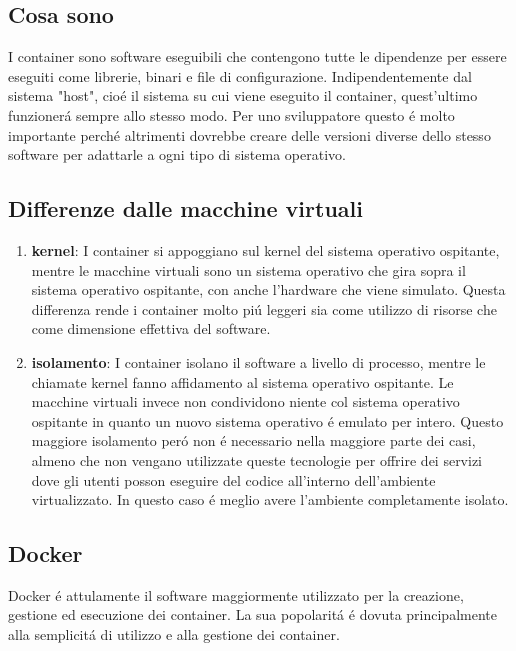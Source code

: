 \subsection{Cosa sono}
\cite{container}I container sono software eseguibili che contengono tutte le dipendenze per essere eseguiti come librerie, binari e file di configurazione. Indipendentemente dal sistema "host", cioé il sistema su cui viene eseguito il container, quest'ultimo funzionerá sempre allo stesso modo. Per uno sviluppatore questo é molto importante perché altrimenti dovrebbe creare delle versioni diverse dello stesso software per adattarle a ogni tipo di sistema operativo.
\subsection{Differenze dalle macchine virtuali}
\begin{enumerate}
  \item \textbf{kernel}: I container si appoggiano sul kernel del sistema operativo ospitante, mentre le macchine virtuali sono un sistema operativo che gira sopra il sistema operativo ospitante, con anche l'hardware che viene simulato. Questa differenza rende i container molto piú leggeri sia come utilizzo di risorse che come dimensione effettiva del software.
  \item \textbf{isolamento}: I container isolano il software a livello di processo, mentre le chiamate kernel fanno affidamento al sistema operativo ospitante. Le macchine virtuali invece non condividono niente col sistema operativo ospitante in quanto un nuovo sistema operativo é emulato per intero. Questo maggiore isolamento peró non é necessario nella maggiore parte dei casi, almeno che non vengano utilizzate queste tecnologie per offrire dei servizi dove gli utenti posson eseguire del codice all'interno dell'ambiente virtualizzato. In questo caso é meglio avere l'ambiente completamente isolato.
\end{enumerate}

\subsection{Docker}
\cite{docker}Docker é attulamente il software maggiormente utilizzato per la creazione, gestione ed esecuzione dei container. La sua popolaritá é dovuta principalmente alla semplicitá di utilizzo e alla gestione dei container.

